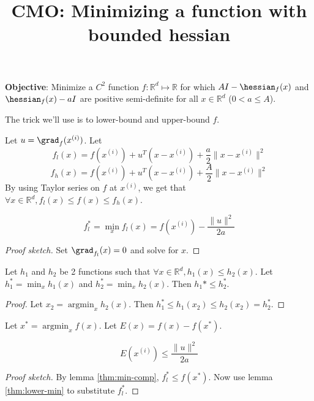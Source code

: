 


\title{CMO: Minimizing a function with bounded hessian}



\maketitle
\initMinimal{}

\textbf{Objective}: Minimize a $C^2$ function $f: \mathbb{R}^d \mapsto \mathbb{R}$
for which $AI - \hessian_f(x)$ and $\hessian_f(x) - aI$ are
positive semi-definite for all $x \in \mathbb{R}^d$ ($0 < a \le A$).

The trick we'll use is to lower-bound and upper-bound $f$.

Let $u = \grad_f(x^{(i)})$. Let
\[ f_l(x) = f(x^{(i)}) + u^T(x - x^{(i)}) + \frac{a}{2}\|x - x^{(i)}\|^2 \]
\[ f_h(x) = f(x^{(i)}) + u^T(x - x^{(i)}) + \frac{A}{2}\|x - x^{(i)}\|^2 \]
By using Taylor series on $f$ at $x^{(i)}$, we get that
$\forall x \in \mathbb{R}^d, f_l(x) \le f(x) \le f_h(x)$.

\begin{lemma}
\label{thm:lower-min}
\[ f_l^* = \min_x f_l(x) = f(x^{(i)}) - \frac{\|u\|^2}{2a} \]
\end{lemma}
\begin{proof}[Proof sketch] Set $\grad_{f_l}(x) = 0$ and solve for $x$. \end{proof}

\begin{lemma}
\label{thm:min-comp}
Let $h_1$ and $h_2$ be 2 functions
such that $\forall x \in \mathbb{R}^d, h_1(x) \le h_2(x)$.
Let $h_1^* = \min_x h_1(x)$
and $h_2^* = \min_x h_2(x)$.
Then $h_1* \le h_2^*$.
\end{lemma}
\begin{proof}
Let $x_2 = \operatorname{argmin}_x h_2(x)$.
Then $h_1^* \le h_1(x_2) \le h_2(x_2) = h_2^*$.
\end{proof}

Let $x^* = \operatorname{argmin}_x f(x)$.
Let $E(x) = f(x) - f(x^*)$.

\begin{lemma}
\[ E(x^{(i)}) \le \frac{\|u\|^2}{2a} \]
\end{lemma}
\begin{proof}[Proof sketch]
By lemma \ref{thm:min-comp}, $f_l^* \le f(x^*)$.
Now use lemma \ref{thm:lower-min} to substitute $f_l^*$.
\end{proof}

